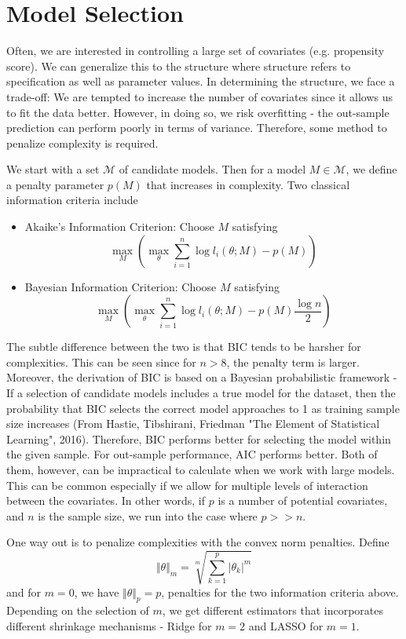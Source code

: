 \section{Model Selection}
Often, we are interested in controlling a large set of covariates (e.g. propensity score). We can generalize this to the structure where structure refers to specification as well as parameter values. In determining the structure, we face a trade-off: We are tempted to increase the number of covariates since it allows us to fit the data better. However, in doing so, we risk overfitting - the out-sample prediction can perform poorly in terms of variance. Therefore, some method to penalize complexity is required. 
\par
We start with a set $\mathcal{M}$ of candidate models. Then for a model $M\in\mathcal{M}$, we define a penalty parameter $p(M)$ that increases in complexity. Two classical information criteria include
\begin{itemize}
\item Akaike's Information Criterion: Choose $M$ satisfying
\[
\max_{M}\left(\max_\theta \sum_{i=1}^n \log{l_i(\theta;M)}-p(M) \right)
\]
\item Bayesian Information Criterion: Choose $M$ satisfying
\[
\max_{M}\left(\max_\theta \sum_{i=1}^n \log{l_i(\theta;M)}-p(M)\frac{\log{n}}{2} \right)
\]
\end{itemize}
The subtle difference between the two is that BIC tends to be harsher for complexities. This can be seen since for $n>8$, the penalty term is larger. Moreover, the derivation of BIC is based on a Bayesian probabilistic framework - If a selection of candidate models includes a true model for the dataset, then the probability that BIC selects the correct model approaches to 1 as training sample size increases (From Hastie, Tibshirani, Friedman "The Element of Statistical Learning", 2016). Therefore, BIC performs better for selecting the model within the given sample. For out-sample performance, AIC performs better. Both of them, however, can be impractical to calculate when we work with large models. This can be common especially if we allow for multiple levels of interaction between the covariates. In other words, if $p$ is a number of potential covariates, and $n$ is the sample size, we run into the case where $p>>n$. \par
One way out is to penalize complexities with the convex norm penalties. Define
\[
\Vert \theta \Vert _m = \sqrt[m]{\sum_{k=1}^p \vert \theta_k \vert ^m}
\]
and for $m=0$, we have $\Vert \theta \Vert _p=p$, penalties for the two information criteria above. Depending on the selection of $m$, we get different estimators that incorporates different shrinkage mechanisms - Ridge for $m=2$ and LASSO for $m=1$. \par
